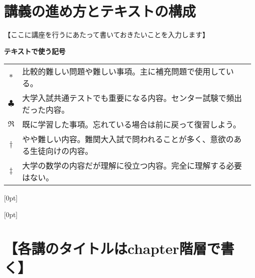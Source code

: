 \documentclass[upLaTeX,dvipdfmx,b5j,openany,autodetect-engine,dvipdfmx-if-dvi,ja=standard,11pt]{jsbook}
\begin{document}
\newpage

\chapter*{講義の進め方とテキストの構成}

【ここに講座を行うにあたって書いておきたいことを入力します】

\vfill

\noindent
{\bf テキストで使う記号}

\begin{tabular}{cl}
$\ast$ & 比較的難しい問題や難しい事項。主に補充問題で使用している。\\
$\clubsuit$ & 大学入試共通テストでも重要になる内容。センター試験で頻出だった内容。\\
$\Re$ & 既に学習した事項。忘れている場合は前に戻って復習しよう。\\
$\dagger$ & やや難しい内容。難関大入試で問われることが多く、意欲のある生徒向けの内容。\\
$\ddagger$ & 大学の数学の内容だが理解に役立つ内容。完全に理解する必要はない。
\end{tabular}

\newpage

[0pt]{}{\thecontentslabel \hspace{5mm}}{}{\makebox[2mm][r]{\thecontentspage}}

[0pt]{}{\thecontentslabel \hspace{5mm}}{}{\makebox[2mm][r]{\thecontentspage}}

\tableofcontents


\newpage


\chapter{【各講のタイトルはchapter階層で書く】}
\end{document}
